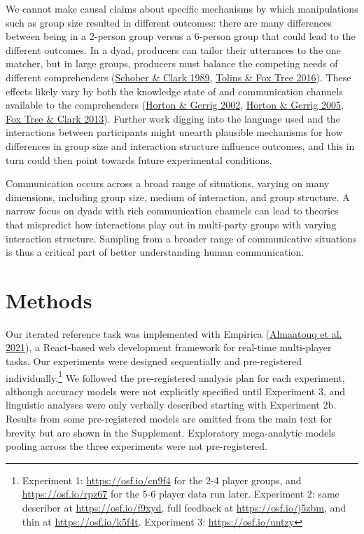 \documentclass[
  english,
]{article}
\begin{document}
We cannot make causal claims about specific mechanisms by which manipulations such as group size resulted in different outcomes: there are many differences between being in a 2-person group versus a 6-person group that could lead to the different outcomes. In a dyad, producers can tailor their utterances to the one matcher, but in large groups, producers must balance the competing needs of different comprehenders (\protect\hyperlink{ref-schober1989}{Schober \& Clark 1989}, \protect\hyperlink{ref-tolins2016}{Tolins \& Fox Tree 2016}). These effects likely vary by both the knowledge state of and communication channels available to the comprehenders (\protect\hyperlink{ref-horton2002}{Horton \& Gerrig 2002}, \protect\hyperlink{ref-horton2005}{Horton \& Gerrig 2005}, \protect\hyperlink{ref-fox-tree2013}{Fox Tree \& Clark 2013}). Further work digging into the language used and the interactions between participants might unearth plausible mechanisms for how differences in group size and interaction structure influence outcomes, and this in turn could then point towards future experimental conditions.

Communication occurs across a broad range of situations, varying on many dimensions, including group size, medium of interaction, and group structure.
A narrow focus on dyads with rich communication channels can lead to theories that mispredict how interactions play out in multi-party groups with varying interaction structure.
Sampling from a broader range of communicative situations is thus a critical part of better understanding human communication.

\hypertarget{methods}{%
\section{Methods}\label{methods}}

Our iterated reference task was implemented with Empirica (\protect\hyperlink{ref-almaatouq2020empirica}{Almaatouq et al. 2021}), a React-based web development framework for real-time multi-player tasks.
Our experiments were designed sequentially and pre-registered individually.\footnote{Experiment 1: \url{https://osf.io/cn9f4} for the 2-4 player groups, and \url{https://osf.io/rpz67} for the 5-6 player data run later. Experiment 2: same describer at \url{https://osf.io/f9xyd}, full feedback at \url{https://osf.io/j5zbm}, and thin at \url{https://osf.io/k5f4t}. Experiment 3: \url{https://osf.io/untzy}}
We followed the pre-registered analysis plan for each experiment, although accuracy models were not explicitly specified until Experiment 3, and linguistic analyses were only verbally described starting with Experiment 2b.
Results from some pre-registered models are omitted from the main text for brevity but are shown in the Supplement.
Exploratory mega-analytic models pooling across the three experiments were not pre-registered.
\end{document}
